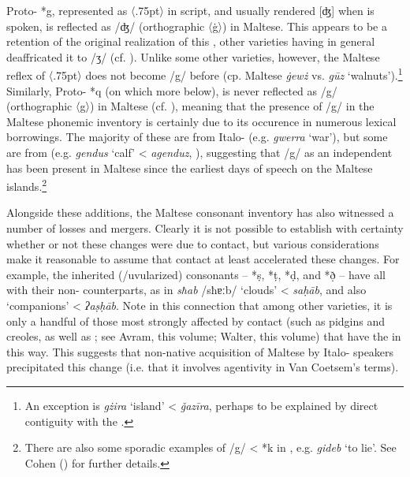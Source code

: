 \documentclass[output=paper]{langsci/langscibook}
\begin{document}
Proto- *g, represented as 〈\kern .75pt{}〉 in  script, and usually rendered [ʤ] when   is spoken, is reflected as /ʤ/ (orthographic 〈ġ〉) in Maltese. This appears to be a retention of the original  realization of this , other  varieties having in general deaffricated it to /ʒ/ (cf. \citealt[136]{Heath2002}). Unlike some other  varieties, however, the Maltese reflex of 〈\kern .75pt{}〉 does not become /g/ before  (cp. Maltese \textit{ġewż} vs.  \textit{gūz} `walnuts').\footnote{An exception is \textit{gżira} `island' <  \textit{ǧaz\={i}ra}, perhaps to be explained by direct contiguity with the .} Similarly, Proto- *q (on which more below), is never reflected as /g/ (orthographic 〈g〉) in Maltese (cf. \citealt[99]{Vanhove1998}), meaning that the presence of /g/ in the Maltese phonemic inventory is certainly due to its occurence in numerous lexical borrowings. The majority of these are from Italo- (e.g. \textit{gwerra} `war'), but some are from  (e.g. \textit{gendus} `calf' <  \textit{agenduz}, \citealt[827]{naitzerrad2002}), suggesting that /g/ as an independent  has been present in Maltese since the earliest days of  speech on the Maltese islands.\footnote{There are also some sporadic examples of /g/ < *k in  , e.g. \textit{gideb} `to lie'. See Cohen (\citeyear[14--15]{cohen1966}) for further details.}


 \label{mergers}
Alongside these additions, the Maltese consonant  inventory has also witnessed a number of losses and mergers. Clearly it is not possible to establish with certainty whether or not these changes were due to contact, but various considerations make it reasonable to assume that contact at least accelerated these changes. For example, the inherited  (/uvularized) consonants -- *\d{s}, *\d{t}, *\d{d}, and *\d{ð} -- have all  with their non- counterparts, as in \textit{sħab} /sħɐːb/ `clouds' < \textit{sa\d{h}\={a}b}, and also `companions' < \textit{ʔa\d{s}\d{h}\={a}b}. Note in this connection that among other  varieties, it is only a handful of those most strongly affected by contact (such as pidgins and creoles, as well as  ; see Avram, this volume; Walter, this volume) that have  the  in this way. This suggests that non-native acquisition of Maltese by Italo- speakers precipitated this change (i.e. that it involves  agentivity in Van Coetsem's \citeyear{VanCoetsem1988,VanCoetsem2000} terms).
\end{document}
